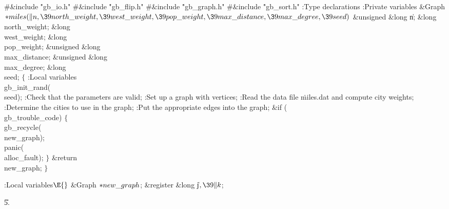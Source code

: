 \Y\B\8\#\&{include} \.{"gb\_io.h"}\6
\8\#\&{include} \.{"gb\_flip.h"}\6
\8\#\&{include} \.{"gb\_graph.h"}\6
\8\#\&{include} \.{"gb\_sort.h"}\6
\ATH\7
:Type declarations\X\6
:Private variables\X\7
\1\1\&{Graph} ${}{*}\\{miles}(\|n,\39\\{north\_weight},\39\\{west\_weight},\39%
\\{pop\_weight},\39\\{max\_distance},\39\\{max\_degree},\39\\{seed}){}$\6
\&{unsigned} \&{long} \|n;\6
\&{long} \\{north\_weight};%
\6
\&{long} \\{west\_weight};%
\6
\&{long} \\{pop\_weight};%
\6
\&{unsigned} \&{long} \\{max\_distance};\6
\&{unsigned} \&{long} \\{max\_degree};\6
\&{long} \\{seed};\2\2\6
${}\{{}$\5
\1:Local variables\X\7
\\{gb\_init\_rand}(\\{seed});\6
:Check that the parameters are valid\X;\6
:Set up a graph with  vertices\X;\6
:Read the data file \.{miles.dat} and compute city weights\X;\6
:Determine the  cities to use in the graph\X;\6
:Put the appropriate edges into the graph\X;\6
\&{if} (\\{gb\_trouble\_code})\5
${}\{{}$\1\6
\\{gb\_recycle}(\\{new\_graph});\6
\\{panic}(\\{alloc\_fault});\6
\4${}\}{}$\2\6
\&{return} \\{new\_graph};\6
\4${}\}{}$\2\par
\fi

\B{}:Local variables\X${}\E{}$\6
\&{Graph} ${}{*}\\{new\_graph}{}$;%
\6
\&{register} \&{long} \|j${},\39\|k{}$;\par
\U5.\fi

